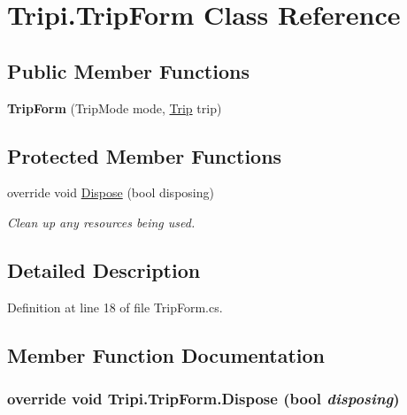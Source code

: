 \hypertarget{class_tripi_1_1_trip_form}{
\section{Tripi.TripForm Class Reference}
\label{class_tripi_1_1_trip_form}
}
\subsection*{Public Member Functions}
\begin{DoxyCompactItemize}
\item 
\hypertarget{class_tripi_1_1_trip_form_abfd798f835858c4463761bdc8e22ae2c}{
{\bfseries TripForm} (TripMode mode, \hyperlink{class_trip}{Trip} trip)}
\label{class_tripi_1_1_trip_form_abfd798f835858c4463761bdc8e22ae2c}

\end{DoxyCompactItemize}
\subsection*{Protected Member Functions}
\begin{DoxyCompactItemize}
\item 
override void \hyperlink{class_tripi_1_1_trip_form_a0ece30c805935b9577a206c7bb98415e}{Dispose} (bool disposing)
\begin{DoxyCompactList}\small\item\em Clean up any resources being used. \item\end{DoxyCompactList}\end{DoxyCompactItemize}


\subsection{Detailed Description}


Definition at line 18 of file TripForm.cs.

\subsection{Member Function Documentation}
\hypertarget{class_tripi_1_1_trip_form_a0ece30c805935b9577a206c7bb98415e}{
\subsubsection[{Dispose}]{\setlength{\rightskip}{0pt plus 5cm}override void Tripi.TripForm.Dispose (bool {\em disposing})}}
\label{class_tripi_1_1_trip_form_a0ece30c805935b9577a206c7bb98415e}


